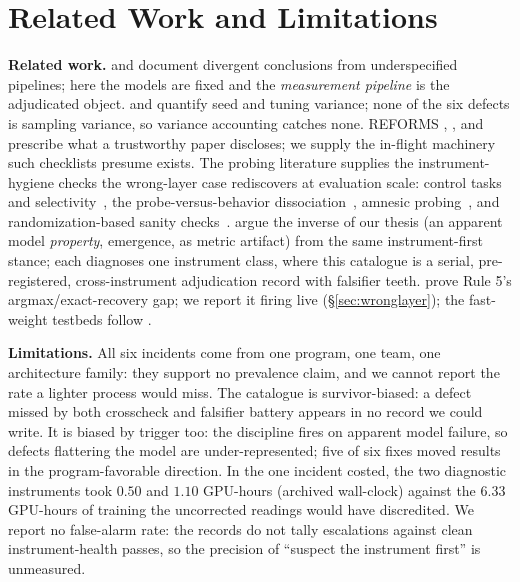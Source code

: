 \section{Related Work and Limitations}
\label{sec:related}

 \textbf{Related work.} \citet{silberzahn2018many} and
\citet{damour2020underspecification} document divergent conclusions
from underspecified pipelines; here the models are fixed and
the \emph{measurement pipeline} is the adjudicated object.
\citet{henderson2018deep} and
\citet{bouthillier2021accounting} quantify seed and tuning variance;
none of the six defects is sampling variance, so variance
accounting catches none. REFORMS
\citep{kapoor2023reforms}, \citet{sculley2018winners}, and
\citet{lipton2018troubling} prescribe what a trustworthy paper
discloses; we supply the in-flight machinery such checklists
presume exists. The probing literature supplies the
instrument-hygiene checks the wrong-layer case rediscovers at
evaluation scale: control tasks and
selectivity~\citep{hewitt2019control}, the probe-versus-behavior
dissociation~\citep{belinkov2022probing}, amnesic
probing~\citep{elazar2021amnesic}, and randomization-based sanity
checks~\citep{adebayo2018sanity}. \citet{schaeffer2023emergent}
argue the inverse of our thesis (an apparent model \emph{property},
emergence, as metric artifact) from the same
instrument-first stance; each diagnoses one instrument
class, where this catalogue is a serial, pre-registered,
cross-instrument adjudication record with falsifier teeth.
\citet{nichani2025factual} prove Rule 5's argmax/exact-recovery gap;
we report it firing live (\S\ref{sec:wronglayer}); the fast-weight
testbeds follow \citet{schlag2021linear}.

 \textbf{Limitations.} All six incidents come from one program, one
team, one architecture family: they support no prevalence claim, and
we cannot report the rate a lighter process would miss.
The catalogue is survivor-biased: a defect missed by both crosscheck
and falsifier battery appears in no record we could write. It is
biased by trigger too: the discipline fires on apparent model
failure, so defects flattering the model are under-represented; five
of six fixes moved results in the program-favorable direction. In the
one incident costed, the two diagnostic instruments took $0.50$ and
$1.10$ GPU-hours (archived wall-clock) against the $6.33$ GPU-hours
of training the uncorrected readings would have discredited. We
report no false-alarm rate: the records do not tally escalations
against clean instrument-health passes, so the precision of
``suspect the instrument first'' is unmeasured.
